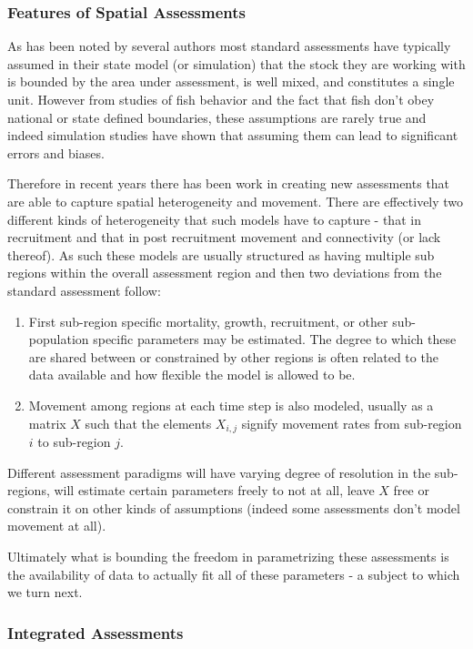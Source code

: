 \documentclass[11pt]{article}
\begin{document}
\subsubsection{Features of Spatial Assessments}

As has been noted by several authors most standard assessments have typically assumed in their state model (or simulation) that the stock they are working with is bounded by the area under assessment, is well mixed, and constitutes a single unit. However from studies of fish behavior and the fact that fish don't obey national or state defined boundaries, these assumptions are rarely true and indeed simulation studies have shown that assuming them can lead to significant errors and biases. 

Therefore in recent years there has been work in creating new assessments that are able to capture spatial heterogeneity and movement. There are effectively two different kinds of heterogeneity that such models have to capture - that in recruitment and that in post recruitment movement and connectivity (or lack thereof). As such these models are usually structured as having multiple sub regions within the overall assessment region and then two deviations from the standard assessment follow:

\begin{enumerate}
\item First sub-region specific mortality, growth, recruitment, or other sub-population specific parameters may be estimated. The degree to which these are shared between or constrained by other regions is often related to the data available and how flexible the model is allowed to be.
\item Movement among regions at each time step is also modeled, usually as a matrix $X$ such that the elements $X_{i,j}$ signify movement rates from sub-region $i$ to sub-region $j$. 
\end{enumerate} 

Different assessment paradigms will have varying degree of resolution in the sub-regions, will estimate certain parameters freely to not at all, leave $X$ free or constrain it on other kinds of assumptions (indeed some assessments don't model movement at all). 

Ultimately what is bounding the freedom in parametrizing these assessments is the availability of data to actually fit all of these parameters - a subject to which we turn next.

\subsubsection{Integrated Assessments}
\end{document}
